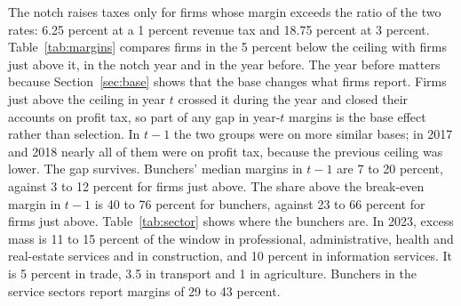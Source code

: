 \documentclass[12pt]{article}
\begin{document}
The notch raises taxes only for firms whose margin exceeds the ratio of the two rates: 6.25 percent at a 1 percent revenue tax and 18.75 percent at 3 percent. Table~\ref{tab:margins} compares firms in the 5 percent below the ceiling with firms just above it, in the notch year and in the year before. The year before matters because Section~\ref{sec:base} shows that the base changes what firms report. Firms just above the ceiling in year $t$ crossed it during the year and closed their accounts on profit tax, so part of any gap in year-$t$ margins is the base effect rather than selection. In $t-1$ the two groups were on more similar bases; in 2017 and 2018 nearly all of them were on profit tax, because the previous ceiling was lower. The gap survives. Bunchers' median margins in $t-1$ are 7 to 20 percent, against 3 to 12 percent for firms just above. The share above the break-even margin in $t-1$ is 40 to 76 percent for bunchers, against 23 to 66 percent for firms just above. Table~\ref{tab:sector} shows where the bunchers are. In 2023, excess mass is 11 to 15 percent of the window in professional, administrative, health and real-estate services and in construction, and 10 percent in information services. It is 5 percent in trade, 3.5 in transport and 1 in agriculture. Bunchers in the service sectors report margins of 29 to 43 percent.
\end{document}
